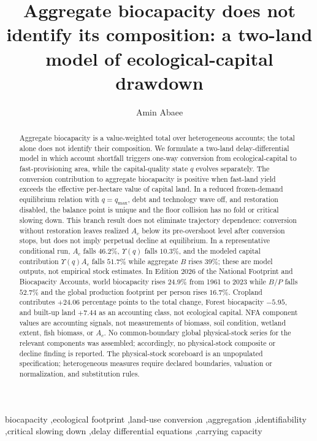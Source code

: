 \documentclass[preprint,12pt,authoryear]{elsarticle}
\begin{document}
\begin{frontmatter}

\title{Aggregate biocapacity does not identify its composition: a two-land model of ecological-capital drawdown}

\author[1]{Amin Abaee}

\begin{abstract}
\footnotesize
Aggregate biocapacity is a value-weighted total over heterogeneous accounts; the total alone does not identify their composition. We formulate a two-land delay-differential model in which account shortfall triggers one-way conversion from ecological-capital to fast-provisioning area, while the capital-quality state $q$ evolves separately. The conversion contribution to aggregate biocapacity is positive when fast-land yield exceeds the effective per-hectare value of capital land. In a reduced frozen-demand equilibrium relation with $q=q_{\max}$, debt and technology wave off, and restoration disabled, the balance point is unique and the floor collision has no fold or critical slowing down. This branch result does not eliminate trajectory dependence: conversion without restoration leaves realized $A_c$ below its pre-overshoot level after conversion stops, but does not imply perpetual decline at equilibrium. In a representative conditional run, $A_c$ falls $46.2\%$, $\Upsilon(q)$ falls $10.3\%$, and the modeled capital contribution $\Upsilon(q)A_c$ falls $51.7\%$ while aggregate $B$ rises $39\%$; these are model outputs, not empirical stock estimates. In Edition 2026 of the National Footprint and Biocapacity Accounts, world biocapacity rises $24.9\%$ from 1961 to 2023 while $B/P$ falls $52.7\%$ and the global production footprint per person rises $16.7\%$. Cropland contributes $+24.06$ percentage points to the total change, Forest biocapacity $-5.95$, and built-up land $+7.44$ as an accounting class, not ecological capital. NFA component values are accounting signals, not measurements of biomass, soil condition, wetland extent, fish biomass, or $A_c$. No common-boundary global physical-stock series for the relevant components was assembled; accordingly, no physical-stock composite or decline finding is reported. The physical-stock scoreboard is an unpopulated specification; heterogeneous measures require declared boundaries, valuation or normalization, and substitution rules.
\end{abstract}

\begin{keyword}
\footnotesize
biocapacity \sep ecological footprint \sep land-use conversion \sep aggregation \sep identifiability \sep critical slowing down \sep delay differential equations \sep carrying capacity
\end{keyword}

\end{frontmatter}
\end{document}
